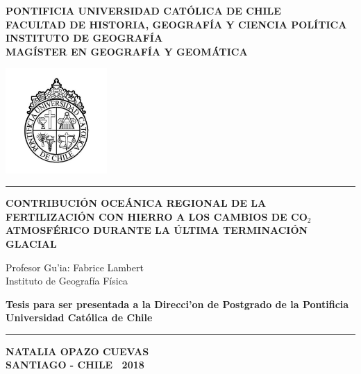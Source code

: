 \documentclass[letterpaper,11pt]{book} %
\begin{document}
\begin{titlepage}
 \begin{center}
\textbf{PONTIFICIA UNIVERSIDAD CAT\'OLICA DE CHILE} \\ 
\textbf{FACULTAD DE HISTORIA, GEOGRAF\'IA Y CIENCIA POL\'ITICA } \\
\textbf{INSTITUTO DE GEOGRAF\'IA} \\
\textbf{MAG\'ISTER EN GEOGRAF\'IA Y GEOM\'ATICA}

\includegraphics[height=4cm]{puc_logo.jpg}

\vspace{1cm} %

\rule{15cm}{0.1cm}

\vspace{1cm}

{\LARGE{\bf{CONTRIBUCI\'ON OCE\'ANICA REGIONAL DE LA FERTILIZACI\'ON CON HIERRO A LOS CAMBIOS DE CO$_{2}$ ATMOSF\'ERICO DURANTE LA \'ULTIMA TERMINACI\'ON GLACIAL }}}

\vspace{1cm}

{\large Profesor Gu'ia: Fabrice Lambert \\ 
Instituto de Geograf\'ia F\'isica \\ }
 
 \vspace{1cm}
 
 {\Large \bf Tesis para ser presentada a la Direcci'on de Postgrado de la Pontificia Universidad Cat\'olica de Chile}

 
\vspace{1cm}
% 
\rule{15cm}{0.1cm}

\vspace{0.5cm}

\textbf{NATALIA OPAZO CUEVAS \\ SANTIAGO -  CHILE \  2018}
\bigskip

\end{center}

\newpage

\thispagestyle{empty} %
\vspace{5cm}


\end{titlepage}
\end{document}
